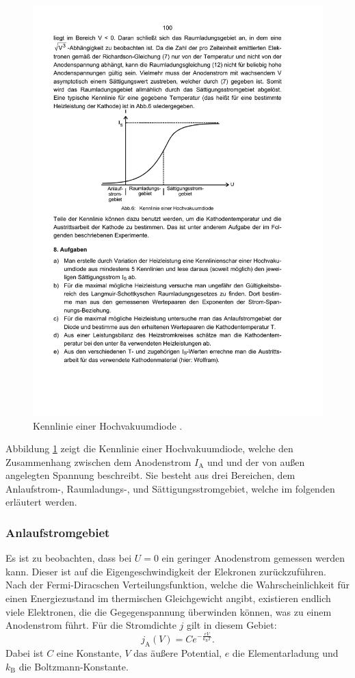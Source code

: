 \begin{figure}
  \centering
  \includegraphics[scale=0.8]{content/kennlinie.pdf}
\caption{Kennlinie einer Hochvakuumdiode \cite{anleitung504}.}
  \label{fig:kennlinie}
\end{figure}

Abbildung \ref{fig:kennlinie} zeigt die Kennlinie einer Hochvakuumdiode, welche den Zusammenhang zwischen dem Anodenstrom $I_\mathrm{A}$ und und der von außen angelegten Spannung beschreibt. Sie besteht aus drei Bereichen, dem Anlaufstrom-, Raumladungs-, und Sättigungsstromgebiet, welche im folgenden erläutert werden.

\subsubsection{Anlaufstromgebiet}
Es ist zu beobachten, dass bei $U=0$ ein geringer Anodenstrom gemessen werden kann. Dieser ist auf die Eigengeschwindigkeit der Elekronen zurückzuführen.
Nach der Fermi-Diracschen Verteilungsfunktion, welche die Wahrscheinlichkeit für einen Energiezustand im thermischen Gleichgewicht angibt, existieren endlich viele Elektronen, die die Gegegenspannung überwinden können, was zu einem Anodenstrom führt.
Für die Stromdichte $j$ gilt in diesem Gebiet:
\begin{equation}
  j_\mathrm{A}(V)=C e^{-\frac{e V}{k_\mathrm{B}T}}.
\end{equation}
Dabei ist $C$ eine Konstante, $V$ das äußere Potential, $e$ die Elementarladung und $k_\mathrm{B}$ die Boltzmann-Konstante.

